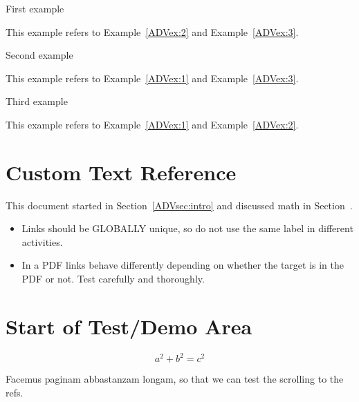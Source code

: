 \documentclass[landscape]{ximera}
\begin{document}
\begin{example} \label{ADVex:1}
 First example  

 This example refers to Example~\ref{ADVex:2} and Example~\ref{ADVex:3}.

\end{example}
\begin{example} \label{ADVex:2}
 Second example  

  This example refers to Example~\ref{ADVex:1} and Example~\ref{ADVex:3}.
\end{example}
\begin{example} \label{ADVex:3}
 Third example  

  This example refers to Example~\ref{ADVex:1} and Example~\ref{ADVex:2}.
\end{example}


\section{Custom Text Reference}

This document started in Section~\ref{ADVsec:intro} and discussed math in Section~.


\begin{remark}

    \begin{itemize}
        \item  Links should be GLOBALLY unique, so do not use the same label in different activities.
        \item  In a PDF links behave differently depending on whether the target is in the PDF or not. 
            Test carefully and thoroughly.
    \end{itemize}
\end{remark}


\section{Start of Test/Demo Area}

\begin{equation}
a^2 + b^2 = c^2    \label{ADVeq:pyth2}
\end{equation}

Facemus paginam abbastanzam longam, so that we can test the scrolling to the refs.

\lipsum[1]

\lipsum[2]

\lipsum[3]

\lipsum[4]

\hrulefill
\end{document}
